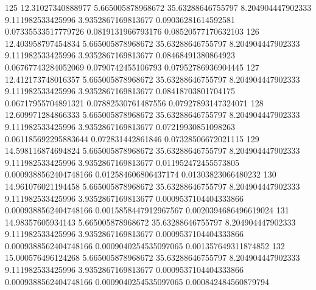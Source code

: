 {125 12.31027340888977 5.665005878968672 35.63288646755797 8.204904447902333 9.111982533425996 3.9352867169813677 0.09036281614592581 0.07335533517779726 0.0819131966793176 0.08520577170632103
126 12.403958797454834 5.665005878968672 35.63288646755797 8.204904447902333 9.111982533425996 3.9352867169813677 0.08468491380864923 0.06767743284052069 0.0790742455106793 0.07952786936904445
127 12.412173748016357 5.665005878968672 35.63288646755797 8.204904447902333 9.111982533425996 3.9352867169813677 0.08418703801704175 0.06717955704891321 0.07882530761487556 0.07927893147324071
128 12.609971284866333 5.665005878968672 35.63288646755797 8.204904447902333 9.111982533425996 3.9352867169813677 0.07219930851098263 0.061185692295883644 0.072831442861846 0.07328506672021115
129 14.598116874694824 5.665005878968672 35.63288646755797 8.204904447902333 9.111982533425996 3.9352867169813677 0.011952472455573805 0.0009388562404748166 0.012584606806437174 0.01303823066480232
130 14.961076021194458 5.665005878968672 35.63288646755797 8.204904447902333 9.111982533425996 3.9352867169813677 0.0009537104404333866 0.0009388562404748166 0.0015858447912967567 0.0020394686496619024
131 14.98357605934143 5.665005878968672 35.63288646755797 8.204904447902333 9.111982533425996 3.9352867169813677 0.0009537104404333866 0.0009388562404748166 0.0009040254535097065 0.001357649311874852
132 15.000576496124268 5.665005878968672 35.63288646755797 8.204904447902333 9.111982533425996 3.9352867169813677 0.0009537104404333866 0.0009388562404748166 0.0009040254535097065 0.000842484560879794
}\tableexpivwaittpsmay
